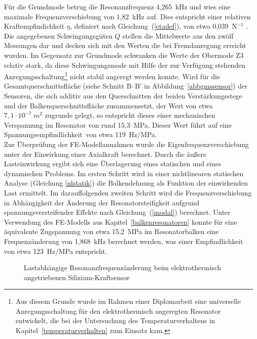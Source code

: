 Für die Grundmode betrug die Resonanzfrequenz
4,265~kHz und wies eine maximale Frequenzverschiebung von 1,82~kHz auf.
Dies entspricht einer relativen Kraftempfindichkeit $\eta$, definiert
nach Gleichung~(\ref{etadef}), von etwa 0,039~N$^{-1}$ \cite{Mue92}.
Die angegebenen Schwingungsgüten $Q$ stellen die
Mittelwerte aus den zwölf Messungen dar und decken sich mit den Werten
die bei Fremdanregung erreicht wurden.
Im Gegensatz zur Grundmode schwanken die Werte der Obermode Z3 relativ
stark, da diese Schwingungsmode mit Hilfe der zur Verfügung stehenden
Anregungsschaltung\footnote{Aus diesem Grunde wurde im Rahmen
einer Diplomarbeit \cite{Wie93} eine universelle Anregungsschaltung für den
elektrothermisch angeregten Resonator entwickelt, die bei der Untersuchung
des Temperaturverhaltens in Kapitel~\ref{temperaturverhalten} zum Einsatz
kam.} nicht stabil angeregt werden konnte.
Wird für die Gesamtquerschnittsfläche (siehe Schnitt B--B' in
Abbildung~\ref{abbgmssensor})
der Sensoren, die sich additiv aus den Querschnitten der beiden
Verstärkungsstege und der Balkenquerschnittsfläche zusammensetzt, der
Wert von etwa $7,1 \cdot 10^{-7} \; m^{2}$ zugrunde gelegt,
so entspricht dieses einer mechanischen Verspannung im Resonator von
rund 15,3~MPa. Dieser Wert führt auf eine
\glqq Spannungsempfindlichkeit\grqq \, von etwa 119~Hz/MPa.\\
Zur Überprüfung der FE-Modellannahmen wurde die Eigenfrequenzverschiebung
unter der Einwirkung einer Axialkraft berechnet. Durch die äußere
Lasteinwirkung ergibt sich eine Überlagerung eines statischen und eines
dynamischen Problems. Im ersten Schritt wird in einer nichtlinearen
statischen Analyse (Gleichung \ref{nlstatik}) die Balkendehnung als Funktion
der einwirkenden Last ermittelt. Im darauffolgenden zweiten Schritt
wird die Frequenzverschiebung in Abhängigkeit der Änderung der
Resonatorsteifigkeit aufgrund spannungsversteifender Effekte nach
Gleichung~(\ref{modal}) berechnet.
Unter Verwendung des FE-Modells aus Kapitel~\ref{balkenresonatoren}
konnte für eine äquivalente Zugspannung von etwa 15,2~MPa im Resonatorbalken
eine Frequenzänderung von 1,868~kHz berechnet werden, was einer
Empfindlichkeit von etwa 123~Hz/MPa entspricht.
\begin{figure}[htb]
\begin{center}

\setabbvsi
\end{center}
\caption{\label{abbkraftfreq}
 Lastabhängige Resonanzfrequenzänderung beim
 elektrothermisch angetriebenen Silizium-Kraftsensor}
\end{figure}
